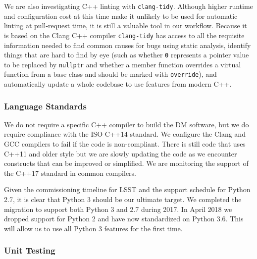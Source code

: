 We are also investigating C++ linting with \texttt{clang-tidy}\cite{clangtidy}. Although higher runtime and configuration cost at this time make it unlikely to be used for automatic linting at pull-request time, it is still a valuable tool in our workflow.
Because it is based on the Clang C++ compiler \texttt{clang-tidy} has access to all the requisite information needed to find common causes for bugs using static analysis, identify things that are hard to find by eye (such as whether \texttt{0} represents a pointer value to be replaced by \texttt{nullptr} and whether a member function overrides a virtual function from a base class and should be marked with \texttt{override}), and automatically update a whole codebase to use features from modern C++.

\subsubsection{Language Standards}

We do not require a specific C++ compiler to build the DM software, but we do require compliance
with the  ISO C++14 standard\cite{cpp14}. We configure the Clang and GCC compilers to fail if the code is non-compliant.
There is still code that uses C++11 and older style but we are slowly updating the code as we encounter constructs that can be improved or simplified.
We are monitoring the support of the C++17 standard in common compilers.

Given the commissioning timeline for LSST and the support schedule for Python 2.7,
it is clear that Python 3 should be our ultimate target. We completed the migration to support both Python 3 and 2.7 during 2017\cite{2016arXiv161100751J}.
In April 2018 we dropped support for Python 2 and have now standardized on Python 3.6\cite{2017arXiv171200461J}.
This will allow us to use all Python 3 features for the first time.

\subsubsection{Unit Testing}

